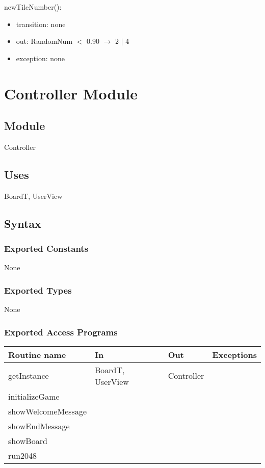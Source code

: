 \documentclass[12pt]{article}
\begin{document}
\noindent newTileNumber(): 
\begin{itemize}
    \item transition: none
    \item out: RandomNum $<$ 0.90 $\rightarrow$ 2 $|$ 4
    \item exception: none
\end{itemize}


\newpage

\section* {Controller Module}

\subsection*{Module}

Controller

\subsection* {Uses}

BoardT, UserView

\subsection* {Syntax}

\subsubsection* {Exported Constants}

None

\subsubsection* {Exported Types}

None

\subsubsection* {Exported Access Programs}

\begin{tabular}{| l | l | l | p{5cm} |}
\hline
\textbf{Routine name} & \textbf{In} & \textbf{Out} & \textbf{Exceptions}\\
\hline
getInstance & BoardT, UserView & Controller& \\
\hline
initializeGame & &  & ~\\
\hline
showWelcomeMessage & &  & ~\\
\hline
showEndMessage & &  & ~\\
\hline
showBoard & &  & ~\\
\hline
run2048 & &  & ~\\
\hline

\end{tabular}
\end{document}
